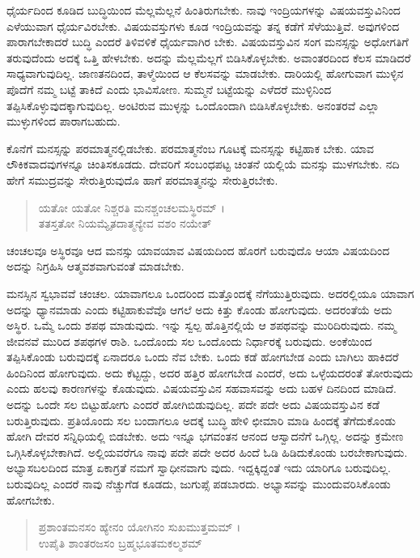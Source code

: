 ಧೈರ್ಯದಿಂದ ಕೂಡಿದ ಬುದ್ಧಿಯಿಂದ ಮೆಲ್ಲಮೆಲ್ಲನೆ ಹಿಂತಿರುಗಬೇಕು. ನಾವು ಇಂದ್ರಿಯಗಳನ್ನು ವಿಷಯವಸ್ತುವಿನಿಂದ ಎಳೆಯುವಾಗ ಧೈರ್ಯವಿರಬೇಕು. ವಿಷಯವಸ್ತುಗಳು ಕೂಡ ಇಂದ್ರಿಯವನ್ನು ತನ್ನ ಕಡೆಗೆ ಸೆಳೆಯುತ್ತಿವೆ. ಅವುಗಳಿಂದ ಪಾರಾಗಬೇಕಾದರೆ ಬುದ್ಧಿ ಎಂದರೆ ತಿಳಿವಳಿಕೆ ಧೈರ್ಯವಾಗಿರ ಬೇಕು. ವಿಷಯವಸ್ತುವಿನ ಸಂಗ ಮನಸ್ಸನ್ನು ಅಧೋಗತಿಗೆ ತರುವುದೆಂದು ಅದಕ್ಕೆ ಒತ್ತಿ ಹೇಳಬೇಕು. ಅದನ್ನು ಮೆಲ್ಲಮೆಲ್ಲಗೆ ಬಿಡಿಸಿಕೊಳ್ಳಬೇಕು. ಅವಾಂತರದಿಂದ ಕೆಲಸ ಮಾಡಿದರೆ ಸಾಧ್ಯವಾಗುವುದಿಲ್ಲ. ಜಾಣತನದಿಂದ, ತಾಳ್ಮೆಯಿಂದ ಆ ಕೆಲಸವನ್ನು ಮಾಡಬೇಕು. ದಾರಿಯಲ್ಲಿ ಹೋಗುವಾಗ ಮುಳ್ಳಿನ ಪೊದೆಗೆ ನಮ್ಮ ಬಟ್ಟೆ ತಾಕಿದೆ ಎಂದು ಭಾವಿಸೋಣ. ಸುಮ್ಮನೆ ಬಟ್ಟೆಯನ್ನು ಎಳೆದರೆ ಮುಳ್ಳಿನಿಂದ ತಪ್ಪಿಸಿಕೊಳ್ಳುವುದಕ್ಕಾಗುವುದಿಲ್ಲ. ಅಂಟಿರುವ ಮುಳ್ಳನ್ನು ಒಂದೊಂದಾಗಿ ಬಿಡಿಸಿಕೊಳ್ಳಬೇಕು. ಅನಂತರವೆ ಎಲ್ಲಾ ಮುಳ್ಳುಗಳಿಂದ ಪಾರಾಗಬಹುದು.

ಕೊನೆಗೆ ಮನಸ್ಸನ್ನು ಪರಮಾತ್ಮನಲ್ಲಿಡಬೇಕು. ಪರಮಾತ್ಮನೆಂಬ ಗೂಟಕ್ಕೆ ಮನಸ್ಸನ್ನು ಕಟ್ಟಿಹಾಕ ಬೇಕು. ಯಾವ ಲೌಕಿಕವಾದವುಗಳನ್ನೂ ಚಿಂತಿಸಕೂಡದು. ದೇವರಿಗೆ ಸಂಬಂಧಪಟ್ಟ ಚಿಂತನೆ ಯಲ್ಲಿಯೆ ಮನಸ್ಸು ಮುಳಗಬೇಕು. ನದಿ ಹೇಗೆ ಸಮುದ್ರವನ್ನು ಸೇರುತ್ತಿರುವುದೊ ಹಾಗೆ ಪರಮಾತ್ಮನನ್ನು ಸೇರುತ್ತಿರಬೇಕು.

\begin{verse}
ಯತೋ ಯತೋ ನಿಶ್ಚರತಿ ಮನಶ್ಚಂಚಲಮಸ್ಥಿರಮ್ ।\\ತತಸ್ತತೋ ನಿಯಮ್ಯೈತದಾತ್ಮನ್ಯೇವ ವಶಂ ನಯೇತ್ 
\end{verse}

{\small ಚಂಚಲವೂ ಅಸ್ಥಿರವೂ ಆದ ಮನಸ್ಸು ಯಾವಯಾವ ವಿಷಯದಿಂದ ಹೊರಗೆ ಬರುವುದೊ ಆಯಾ ವಿಷಯದಿಂದ ಅದನ್ನು ನಿಗ್ರಹಿಸಿ ಆತ್ಮವಶವಾಗುವಂತೆ ಮಾಡಬೇಕು.}

ಮನಸ್ಸಿನ ಸ್ವಭಾವವೆ ಚಂಚಲ. ಯಾವಾಗಲೂ ಒಂದರಿಂದ ಮತ್ತೊಂದಕ್ಕೆ ನೆಗೆಯುತ್ತಿರುವುದು. ಅದರಲ್ಲಿಯೂ ಯಾವಾಗ ಅದನ್ನು ಧ್ಯಾನಮಾಡು ಎಂದು ಕಟ್ಟಿಹಾಕುವೆವೊ ಆಗಲೆ ಅದು ಕಿತ್ತು ಕೊಂಡು ಹೋಗುವುದು. ಅದರಂತೆಯೆ ಅದು ಅಸ್ಥಿರ. ಒಮ್ಮೆ ಒಂದು ಶಪಥ ಮಾಡುವುದು. ಇನ್ನು ಸ್ವಲ್ಪ ಹೊತ್ತಿನಲ್ಲಿಯೆ ಆ ಶಪಥವನ್ನು ಮುರಿದಿರುವುದು. ನಮ್ಮ ಜೀವನವೆ ಮುರಿದ ಶಪಥಗಳ ರಾಶಿ. ಒಂದೊಂದು ಸಲ ಒಂದೊಂದು ನಿರ್ಧಾರಕ್ಕೆ ಬರುವುದು. ಅಂಕೆಯಿಂದ ತಪ್ಪಿಸಿಕೊಂಡು ಬರುವುದಕ್ಕೆ ಏನಾದರೂ ಒಂದು ನೆವ ಬೇಕು. ಒಂದು ಕಡೆ ಹೋಗಬೇಡ ಎಂದು ಬಾಗಿಲು ಹಾಕಿದರೆ ಹಿಂದಿನಿಂದ ಹೋಗುವುದು. ಅದು ಕೆಟ್ಟದ್ದು, ಅದರ ಹತ್ತಿರ ಹೋಗಬೇಡ ಎಂದರೆ, ಅದು ಒಳ್ಳೆಯದರಂತೆ ತೋರುವುದು ಎಂದು ಹಲವು ಕಾರಣಗಳನ್ನು ಕೊಡುವುದು. ವಿಷಯವಸ್ತುವಿನ ಸಹವಾಸವನ್ನು ಅದು ಬಹಳ ದಿನದಿಂದ ಮಾಡಿದೆ. ಅದನ್ನು ಒಂದೇ ಸಲ ಬಿಟ್ಟುಹೋಗು ಎಂದರೆ ಹೋಗಿಬಿಡುವುದಿಲ್ಲ. ಪದೇ ಪದೇ ಅದು ವಿಷಯವಸ್ತುವಿನ ಕಡೆ ಬರುತ್ತಿರುವುದು. ಪ್ರತಿಯೊಂದು ಸಲ ಬಂದಾಗಲೂ ಅದಕ್ಕೆ ಬುದ್ಧಿ ಹೇಳಿ ಛೀಮಾರಿ ಮಾಡಿ ಹಿಂದಕ್ಕೆ ತೆಗೆದುಕೊಂಡು ಹೋಗಿ ದೇವರ ಸನ್ನಿಧಿಯಲ್ಲಿ ಬಿಡಬೇಕು. ಅದು ಇನ್ನೂ ಭಗವಂತನ ಆನಂದ ಆಸ್ವಾದನೆಗೆ ಒಗ್ಗಿಲ್ಲ. ಅದನ್ನು ಕ್ರಮೇಣ ಒಗ್ಗಿಸಿಕೊಳ್ಳಬೇಕಾಗಿದೆ. ಅಲ್ಲಿಯವರೆಗೂ ನಾವು ಪದೇ ಪದೇ ಅದರ ಹಿಂದೆ ಓಡಿ ಹಿಡಿದುಕೊಂಡು ಬರಬೇಕಾಗುವುದು. ಅಭ್ಯಾಸಬಲದಿಂದ ಮಾತ್ರ ಏಕಾಗ್ರತೆ ನಮಗೆ ಸ್ವಾಧೀನವಾಗು ವುದು. ಇದ್ದಕ್ಕಿದ್ದಂತೆ ಇದು ಯಾರಿಗೂ ಬರುವುದಿಲ್ಲ. ಬರುವುದಿಲ್ಲ ಎಂದರೆ ನಾವು ನೆಚ್ಚುಗೆಡ ಕೂಡದು, ಜುಗುಪ್ಸೆ ಪಡಬಾರದು. ಅಭ್ಯಾಸವನ್ನು ಮುಂದುವರಿಸಿಕೊಂಡು ಹೋಗಬೇಕು.

\begin{verse}
ಪ್ರಶಾಂತಮನಸಂ ಹ್ಯೇನಂ ಯೋಗಿನಂ ಸುಖಮುತ್ತಮಮ್ ।\\ಉಪೈತಿ ಶಾಂತರಜಸಂ ಬ್ರಹ್ಮಭೂತಮಕಲ್ಮಶಮ್ 
\end{verse}

